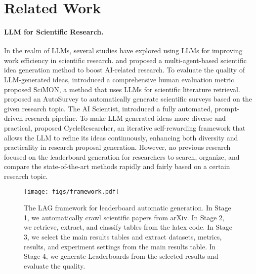 \section{Related Work}
\paragraph{LLM for Scientific Research.}
In the realm of LLMs, several studies have explored using LLMs for improving work efficiency in scientific research.
\citet{Baek2024ResearchAgentIR} and \citet{Yang2023LargeLM} proposed a multi-agent-based scientific idea generation method to boost AI-related research. To evaluate the quality of LLM-generated ideas, \citet{Si2024CanLG} introduced a comprehensive human evaluation metric. 
\citet{Wang2023SciMONSI} proposed SciMON, a method that uses LLMs for scientific literature retrieval.
\citet{Wang2024AutoSurveyLL} proposed an AutoSurvey to automatically generate scientific surveys based on the given research topic. The AI Scientist, \citet{Lu2024TheAS} introduced a fully automated, prompt-driven research pipeline. To make LLM-generated ideas more diverse and practical, \citet{Weng2024CycleResearcherIA} proposed CycleResearcher, an iterative self-rewarding framework that allows the LLM to refine its ideas continuously, enhancing both diversity and practicality in research proposal generation.
However, no previous research focused on the leaderboard generation for researchers to search, organize, and compare the state-of-the-art methods rapidly and fairly based on a certain research topic.

\begin{figure*}
\centering
\texttt{[image: figs/framework.pdf]}
\caption{\label{framework}The LAG framework for leaderboard automatic generation. In Stage 1, we automatically crawl scientific papers from arXiv. In Stage 2, we retrieve, extract, and classify tables from the latex code. In Stage 3,  we select the main results tables and extract datasets, metrics, results, and experiment settings from the main results table. In Stage 4, we generate Leaderboards from the selected results and evaluate the quality.}
\vspace{-.1in}
\end{figure*}

